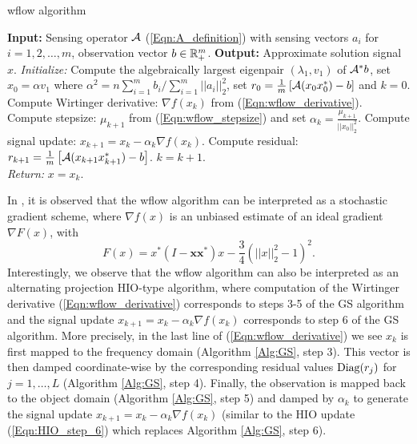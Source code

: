 \begin{algorithm}[H]
\caption{wflow algorithm}	\label{Alg:wflow}

\begin{algorithmic}[1]
	\Statex 	\textbf{Input:} Sensing operator ${\mathcal A}$ (\ref{Eqn:A_definition}) with sensing vectors $a_i$ for $i =1, 2, \ldots, m$, observation vector $b \in {\mathbb R}^m_+$.
	\Statex 	\textbf{Output:} Approximate solution signal $x$.
	\State 		\textit{Initialize:} Compute the algebraically largest eigenpair $(\lambda_1, v_1)$ of ${\mathcal A}^*b$, set $x_0 = \alpha v_1$ where $\alpha^2 =  n \sum_{i=1}^mb_i / \sum_{i=1}^m ||a_i||_2^2$, set $r_0 = \frac{1}{m} \left[ {\mathcal A}(x_{0}x_{0}^*) - b \right]$ and  $k = 0$.
		\State	Compute Wirtinger derivative: $\nabla f(x_k)$ from (\ref{Eqn:wflow_derivative}).
		\State	Compute stepsize: $\mu_{k+1}$ from (\ref{Eqn:wflow_stepsize}) and set $\alpha_k = \frac{\mu_{k+1}}{||x_0||_2^2}$.
		\State 	Compute signal update: $x_{k+1} = x_k - \alpha_k \nabla f(x_k)$.
		\State	Compute residual: $r_{k+1} = \frac{1}{m} \left[ {\mathcal A}(x_{k+1}x_{k+1}^*) - b \right]$.
		\State	$k = k + 1$.
	\EndWhile	\\
	\textit{Return:} $x =  x_k$.
\end{algorithmic}
\end{algorithm}


In \cite[Section 2.3]{DBLP:journals/tit/CandesLS15}, it is observed that the wflow algorithm can be interpreted as a stochastic gradient scheme, where $\nabla f(x)$ is an unbiased estimate of an ideal gradient $\nabla F(x)$, with
\begin{equation}
F(x) = x^* \left( I - \mathbf{x}\mathbf{x}^* \right) x - \frac{3}{4} \left( ||x||_2^2 - 1\right)^2.
\end{equation}
Interestingly, we observe that the wflow algorithm can also be interpreted as an alternating projection HIO-type algorithm, where computation of the Wirtinger derivative (\ref{Eqn:wflow_derivative}) corresponds to steps 3-5 of the GS algorithm and the signal update $x_{k+1} = x_k - \alpha_k \nabla f(x_k)$ corresponds to step 6 of the GS algorithm.  
More precisely, in the last line of (\ref{Eqn:wflow_derivative}) we see $x_k$ is first mapped to the frequency domain (Algorithm \ref{Alg:GS}, step 3).  
This vector is then damped coordinate-wise by the corresponding residual values $\textnormal{Diag}(r_j)$ for $j = 1, \ldots, L$  (Algorithm \ref{Alg:GS}, step 4).  
Finally, the observation is mapped back to the object domain (Algorithm \ref{Alg:GS}, step 5) and damped by $\alpha_k$ to generate the signal update $x_{k+1} = x_k - \alpha_k \nabla f(x_k)$ (similar to the HIO update (\ref{Eqn:HIO_step_6}) which replaces Algorithm \ref{Alg:GS}, step 6).  


